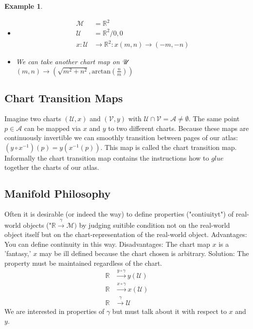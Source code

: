 \documentclass[10pt, oneside]{article}
\newcommand{\R}{\mathbb{R}}
\newcommand{\M}{\mathcal{M}}
\newtheorem{example}{Example}
\begin{document}
        \begin{example}
           \begin{itemize}
              \item \begin{align*}
                 \M &= \R^2 \\
                 \mathcal{U} &= \R^2 \slash {0,0} \\
                 x: \mathcal{U} &\to \R^2 : x(m,n) \to (-m,-n)
              \end{align*}
              \item We can take another chart map on $\mathcal{U}\\$
           $(m,n) \to (\sqrt{m^2+n^2}, \text{arctan}(\frac{n}{m}))$
           \end{itemize}
        \end{example}
     \subsection{Chart Transition Maps}
        Imagine two charts $(\mathcal{U},x)$ and $(\mathcal{V},y)$ with $\mathcal{U} \cap \mathcal{V} = \mathcal{A} \neq \emptyset$. The same point $p \in \mathcal{A}$ can be mapped via $x$ and $y$ to two different charts.
        Because these maps are continuously invertible we can smoothly transition between pages of our atlas: $(y \circ x^{-1})(p) = y(x^{-1}(p))$.
        This map is called the chart transition map. Informally the chart transition map contains the instructions how to $glue$ together the charts of our atlas.
     \subsection{Manifold Philosophy}
        Often it is desirable (or indeed the way) to define properties ("contiuityt") of real-world objects ("$\R \xrightarrow{\gamma}\M)$ by judging suitible condition not on the real-world object itself but on the chart-representation of the real-world object.
        Advantages: You can define continuity in this way.
        Disadvantages: The chart map $x$ is a 'fantasy,' $x$ may be ill defined because the chart chosen is arbitrary.
        Solution: The property must be maintained regardless of the chart.
        \begin{align*}
        \R &\xrightarrow{y \circ \gamma} y(\mathcal{U}) \\
        \R &\xrightarrow{x \circ \gamma} x(\mathcal{U}) \\
        \R &\xrightarrow{\gamma} \mathcal{U}
        \end{align*}
        We are interested in properties of $\gamma$ but must talk about it with respect to $x$ and $y$.
\end{document}
